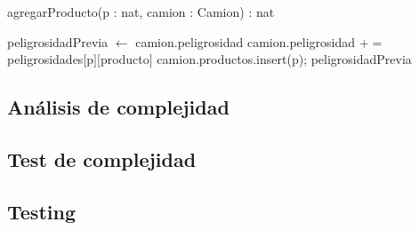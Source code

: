 \begin{algorithm}[H]
\begin{algorithmic}[1]
\caption{agregarProducto(p : nat, camion : Camion) : nat}
\STATE peligrosidadPrevia $\leftarrow$ camion.peligrosidad
	\STATE camion.peligrosidad $+=$ peligrosidades$[$p$][$producto$]$
\ENDFOR
\STATE camion.productos.insert(p);
\RETURN peligrosidadPrevia
\end{algorithmic}
\end{algorithm}



\subsection{An\'alisis de complejidad}


\subsection{Test de complejidad}

\subsection{Testing}
